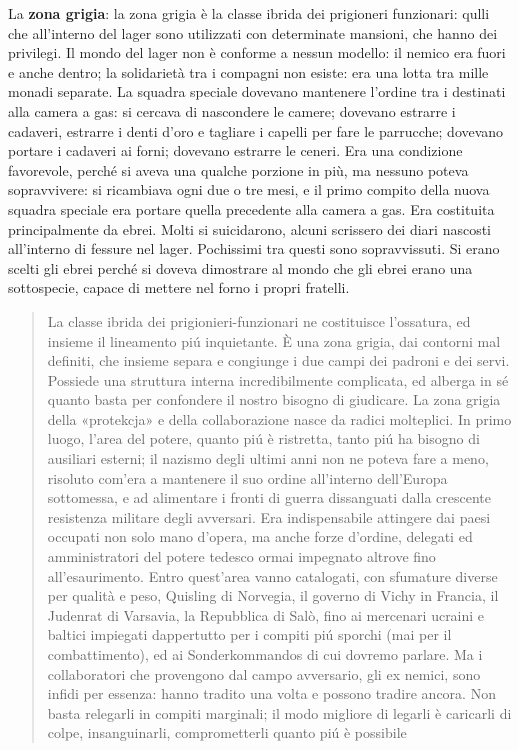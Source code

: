 \documentclass[a4paper, twoside, titlepage]{book}
\newcounter{mar}
\newcommand{\citazione}[1]{%
  \begin{quotation}
  \begin{linenumbers}
  \modulolinenumbers[5]
  \begingroup
  \setlength{\parindent}{0cm}
  \noindent #1
  \endgroup
  \end{linenumbers}
  \end{quotation}\setcounter{linenumber}{1}
  }
\begin{document}
La \textbf{zona grigia}: la zona grigia è la classe ibrida dei prigioneri funzionari: qulli che all'interno del lager sono utilizzati con determinate mansioni, che hanno dei privilegi. Il mondo del lager non è conforme a nessun modello: il nemico era fuori e anche dentro; la solidarietà tra i compagni non esiste: era una lotta tra mille monadi separate.
La squadra speciale dovevano mantenere l'ordine tra i destinati alla camera a gas: si cercava di nascondere le camere; dovevano estrarre i cadaveri, estrarre i denti d'oro e tagliare i capelli per fare le parrucche; dovevano portare i cadaveri ai forni; dovevano estrarre le ceneri.
Era una condizione favorevole, perché si aveva una qualche porzione in più, ma nessuno poteva sopravvivere: si ricambiava ogni due o tre mesi, e il primo compito della nuova squadra speciale era portare quella precedente alla camera a gas. Era costituita principalmente da ebrei. Molti si suicidarono, alcuni scrissero dei diari nascosti all'interno di fessure nel lager. Pochissimi tra questi sono sopravvissuti.
Si erano scelti gli ebrei perché si doveva dimostrare al mondo che gli ebrei erano una sottospecie, capace di mettere nel forno i propri fratelli.
\citazione{ La classe ibrida dei prigionieri-funzionari ne costituisce l’ossatura, ed insieme il lineamento piú inquietante. È una zona grigia, dai contorni mal definiti, che insieme separa e congiunge i due campi dei padroni e dei servi. Possiede una struttura interna incredibilmente complicata, ed alberga in sé quanto basta per confondere il nostro bisogno di giudicare.
La zona grigia della «protekcja» e della collaborazione nasce da radici molteplici. In primo luogo, l’area del potere, quanto piú è ristretta, tanto piú ha bisogno di ausiliari esterni; il nazismo degli ultimi anni non ne poteva fare a meno, risoluto com’era a mantenere il suo ordine all’interno dell’Europa sottomessa, e ad alimentare i fronti di guerra dissanguati dalla crescente resistenza militare degli avversari. Era indispensabile attingere dai paesi occupati non solo mano d’opera, ma anche forze d’ordine, delegati ed amministratori del potere tedesco ormai impegnato altrove fino all’esaurimento. Entro quest’area vanno catalogati, con sfumature diverse per qualità e peso, Quisling di Norvegia, il governo di Vichy in Francia, il Judenrat di Varsavia, la Repubblica di Salò, fino ai mercenari ucraini e baltici impiegati dappertutto per i compiti piú sporchi (mai per il combattimento), ed ai Sonderkommandos di cui dovremo parlare. Ma i collaboratori che provengono dal campo avversario, gli ex nemici, sono infidi per essenza: hanno tradito una volta e possono tradire ancora. Non basta relegarli in compiti marginali; il modo migliore di legarli è caricarli di colpe, insanguinarli, comprometterli quanto piú è possibile}
\end{document}
